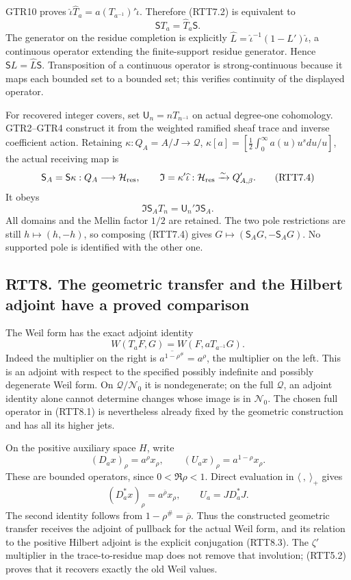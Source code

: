 GTR10 proves \(\widehat\iota\widehat T_a=a(T_{a^{-1}})'\widehat\iota\).
Therefore (RTT7.2) is equivalent to \[
\boxed{\mathsf S T_a=\widehat T_a\mathsf S.}
\tag{RTT7.3}
\] The generator on the residue completion is explicitly
\(\widehat L=\widehat\iota^{-1}(1-L')\widehat\iota\), a continuous
operator extending the finite-support residue generator. Hence
\(\mathsf S L=\widehat L\mathsf S\). Transposition of a continuous
operator is strong-continuous because it maps each bounded set to a
bounded set; this verifies continuity of the displayed operator.

For recovered integer covers, set \(\mathsf U_n=nT_{n^{-1}}\) on actual
degree-one cohomology. GTR2--GTR4 construct it from the weighted
ramified sheaf trace and inverse coefficient action. Retaining
\(\kappa:Q_A=A/J\to\mathcal Q\),
\(\kappa[a]=[\tfrac12\int_0^\infty a(u)u^sdu/u]\), the actual receiving
map is \[
\mathsf S_A=\mathsf S\kappa:Q_A\longrightarrow\mathcal H_{\rm res},
\qquad \mathfrak I=\kappa'\widehat\iota:
\mathcal H_{\rm res}\xrightarrow{\sim}Q'_{A,\beta}.
\tag{RTT7.4}
\] It obeys \[
\mathfrak I\mathsf S_A T_n
=\mathsf U_n'\mathfrak I\mathsf S_A.
\tag{RTT7.5}
\] All domains and the Mellin factor \(1/2\) are retained. The two pole
restrictions are still \(h\mapsto(h,-h)\), so composing (RTT7.4) gives
\(G\mapsto(\mathsf S_A G,-\mathsf S_A G)\). No supported pole is
identified with the other one.

\subsection{RTT8. The geometric transfer and the Hilbert adjoint have a
proved
comparison}\label{rtt8.-the-geometric-transfer-and-the-hilbert-adjoint-have-a-proved-comparison}

The Weil form has the exact adjoint identity \[
W(T_aF,G)=W(F,aT_{a^{-1}}G).
\tag{RTT8.1}
\] Indeed the multiplier on the right is
\(\overline{a^{1-\rho^\#}}=a^\rho\), the multiplier on the left. This is
an adjoint with respect to the specified possibly indefinite and
possibly degenerate Weil form. On \(\mathcal Q/\mathcal N_0\) it is
nondegenerate; on the full \(\mathcal Q\), an adjoint identity alone
cannot determine changes whose image is in \(\mathcal N_0\). The chosen
full operator in (RTT8.1) is nevertheless already fixed by the geometric
construction and has all its higher jets.

On the positive auxiliary space \(H\), write \[
(D_ax)_\rho=a^\rho x_\rho,\qquad
(U_ax)_\rho=a^{1-\rho}x_\rho.
\tag{RTT8.2}
\] These are bounded operators, since \(0<\Re\rho<1\). Direct evaluation
in \(\langle\ ,\ \rangle_+\) gives \[
(D_a^*x)_\rho=a^{\overline\rho}x_\rho,
\qquad \boxed{U_a=J D_a^*J.}
\tag{RTT8.3}
\] The second identity follows from \(1-\rho^\#=\overline\rho\). Thus
the constructed geometric transfer receives the adjoint of pullback for
the actual Weil form, and its relation to the positive Hilbert adjoint
is the explicit conjugation (RTT8.3). The \(\zeta'\) multiplier in the
trace-to-residue map does not remove that involution; (RTT5.2) proves
that it recovers exactly the old Weil values.

